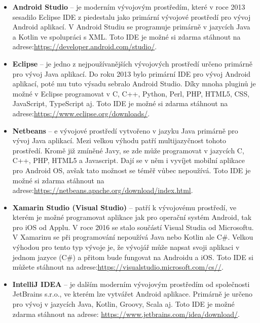 \documentclass{vskpou} %
\begin{document}
\begin{itemize}
    \item \textbf{Android Studio} -- je moderním vývojovým prostředím, které v roce 2013 sesadilo Eclipse IDE z piedestalu jako primární vývojové prostředí pro vývoj Android aplikací. V Android Studiu se programuje primárně v jazycích Java a Kotlin ve spolupráci s XML. Toto IDE je možné si zdarma stáhnout na adrese:\url{https://developer.android.com/studio/}.
    
    \item \textbf{Eclipse} -- je jedno z nejpoužívanějších vývojových prostředí určeno primárně pro vývoj Java aplikací. Do roku 2013 bylo primární IDE pro vývoj Android aplikací, poté mu tuto výsadu sebralo Android Studio. Díky mnoha pluginů je možné v Eclipse programovat v C, C++, Python, Perl, PHP, HTML5, CSS, JavaScript, TypeScript aj. Toto IDE je možné si zdarma stáhnout na adrese:\url{https://www.eclipse.org/downloads/}.\cite{3}
    
    \item \textbf{Netbeans} -- e vývojové prostředí vytvořeno v jazyku Java primárně pro vývoj Java aplikací. Mezi velkou výhodu patří multijazyčnost tohoto prostředí. Kromě již zmíněné Javy, se zde může programovat v jazycích C, C++, PHP, HTML5 a Javascript. Dají se v něm i vyvíjet mobilní aplikace pro Android OS, avšak tato možnost se téměř vůbec nepoužívá. Toto IDE je možné si zdarma stáhnout na adrese:\url{https://netbeans.apache.org/download/index.html}.\cite{12}
    

    
    \item \textbf{Xamarin Studio (Visual Studio)} -- patří k vývojovému prostředí, ve kterém je možné programovat aplikace jak pro operační systém Android, tak pro iOS od Applu. V roce 2016 se stalo součástí Visual Studia od Microsoftu. V Xamarinu se při programování nepoužívá Java nebo Kotlin ale C\#. Velkou výhodou pro tento typ vývoje je, že vývojář může napsat svoji aplikaci v jednom jazyce (C\#) a přitom bude fungovat na Androidu a iOS. Toto IDE si můžete stáhnout na adrese:\url{https://visualstudio.microsoft.com/cs//}.
    
    \item \textbf{IntelliJ IDEA} -- je dalším moderním vývojovým prostředím od společnosti JetBrains s.r.o., ve kterém lze vytvářet Android aplikace. Primárně je určeno pro vývoj v jazycích Java, Kotlin, Groovy, Scala aj. Toto IDE je možné zdarma stáhnout na adrese: \url{https://www.jetbrains.com/idea/download/}.
\end{itemize}
\end{document}
